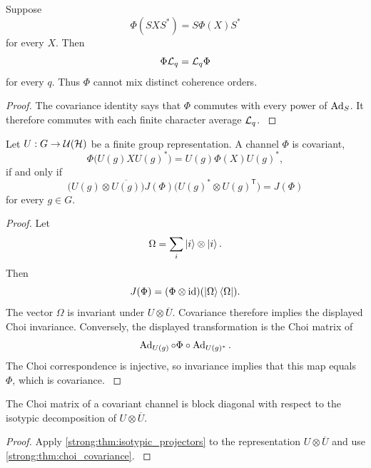 \begin{theorem}\label{strong:theorem:023}\label{strong:thm:covariant_channel}
Suppose
\[
\Phi(SXS^*)=S\Phi(X)S^*
\]
for every \(X\). Then
\[
\Phi\Lcal_q=\Lcal_q\Phi
\]
for every \(q\). Thus \(\Phi\) cannot mix distinct coherence orders.
\end{theorem}

\begin{proof}\label{strong:proof:034}
The covariance identity says that \(\Phi\) commutes with every power of \(\operatorname{Ad}_S\). It therefore commutes with each finite character average \(\Lcal_q\).
\label{strong:proof:034:end}\end{proof}

\begin{theorem}\label{strong:theorem:024}\label{strong:thm:choi_covariance}
Let \(U:G\to\Ucal(\Hcal)\) be a finite group representation. A channel \(\Phi\) is covariant,
\[
\Phi\bigl(U(g)XU(g)^*\bigr)
=
U(g)\Phi(X)U(g)^*,
\]
if and only if
\[
\bigl(U(g)\otimes\overline{U(g)}\bigr)
J(\Phi)
\bigl(U(g)^*\otimes U(g)^{\mathsf T}\bigr)
=
J(\Phi)
\]
for every \(g\in G\).
\end{theorem}

\begin{proof}\label{strong:proof:035}
Let
\[
\Omega=\sum_i\left|i\right\rangle\otimes\left|i\right\rangle.
\]
Then
\[
J(\Phi)=(\Phi\otimes\id)(\ket{\Omega}\bra{\Omega}).
\]
The vector \(\Omega\) is invariant under \(U\otimes\overline U\). Covariance therefore implies the displayed Choi invariance. Conversely, the displayed transformation is the Choi matrix of
\[
\operatorname{Ad}_{U(g)}\circ\Phi\circ\operatorname{Ad}_{U(g)^*}.
\]
The Choi correspondence is injective, so invariance implies that this map equals \(\Phi\), which is covariance.
\label{strong:proof:035:end}\end{proof}

\begin{corollary}\label{strong:corollary:009}\label{strong:cor:choi_packets}
The Choi matrix of a covariant channel is block diagonal with respect to the isotypic decomposition of \(U\otimes\overline U\).
\end{corollary}

\begin{proof}\label{strong:proof:036}
Apply \cref{strong:thm:isotypic_projectors} to the representation \(U\otimes\overline U\) and use \cref{strong:thm:choi_covariance}.
\label{strong:proof:036:end}\end{proof}

